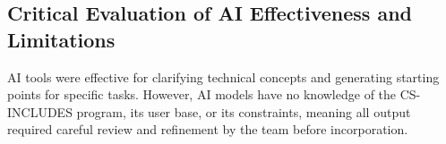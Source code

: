 \subsection{Critical Evaluation of AI Effectiveness and Limitations}

AI tools were effective for clarifying technical concepts and generating
starting points for specific tasks. However, AI models have no knowledge of the
CS-INCLUDES program, its user base, or its constraints, meaning all output
required careful review and refinement by the team before incorporation.

